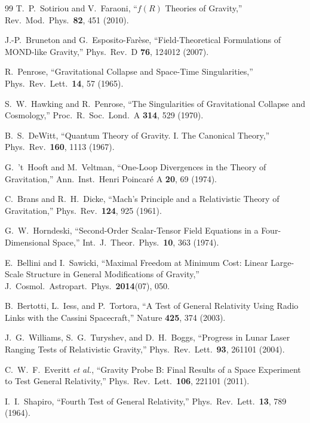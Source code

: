 \begin{thebibliography}{99}
T.~P.~Sotiriou and V.~Faraoni,
``$f(R)$ Theories of Gravity,''
Rev.\ Mod.\ Phys.\ \textbf{82}, 451 (2010).

J.-P.~Bruneton and G.~Esposito-Far\`ese,
``Field-Theoretical Formulations of MOND-like Gravity,''
Phys.\ Rev.\ D \textbf{76}, 124012 (2007).

R.~Penrose,
``Gravitational Collapse and Space-Time Singularities,''
Phys.\ Rev.\ Lett.\ \textbf{14}, 57 (1965).

S.~W.~Hawking and R.~Penrose,
``The Singularities of Gravitational Collapse and Cosmology,''
Proc.\ R.\ Soc.\ Lond.\ A \textbf{314}, 529 (1970).

B.~S.~DeWitt,
``Quantum Theory of Gravity. I. The Canonical Theory,''
Phys.\ Rev.\ \textbf{160}, 1113 (1967).

G.~'t~Hooft and M.~Veltman,
``One-Loop Divergences in the Theory of Gravitation,''
Ann.\ Inst.\ Henri Poincar\'e A \textbf{20}, 69 (1974).

C.~Brans and R.~H.~Dicke,
``Mach's Principle and a Relativistic Theory of Gravitation,''
Phys.\ Rev.\ \textbf{124}, 925 (1961).

G.~W.~Horndeski,
``Second-Order Scalar-Tensor Field Equations in a Four-Dimensional Space,''
Int.\ J.\ Theor.\ Phys.\ \textbf{10}, 363 (1974).

E.~Bellini and I.~Sawicki,
``Maximal Freedom at Minimum Cost: Linear Large-Scale Structure in General Modifications of Gravity,''
J.\ Cosmol.\ Astropart.\ Phys.\ \textbf{2014}(07), 050.

B.~Bertotti, L.~Iess, and P.~Tortora,
``A Test of General Relativity Using Radio Links with the Cassini Spacecraft,''
Nature \textbf{425}, 374 (2003).

J.~G.~Williams, S.~G.~Turyshev, and D.~H.~Boggs,
``Progress in Lunar Laser Ranging Tests of Relativistic Gravity,''
Phys.\ Rev.\ Lett.\ \textbf{93}, 261101 (2004).

C.~W.~F.~Everitt \textit{et al.},
``Gravity Probe B: Final Results of a Space Experiment to Test General Relativity,''
Phys.\ Rev.\ Lett.\ \textbf{106}, 221101 (2011).

I.~I.~Shapiro,
``Fourth Test of General Relativity,''
Phys.\ Rev.\ Lett.\ \textbf{13}, 789 (1964).


\end{thebibliography}
